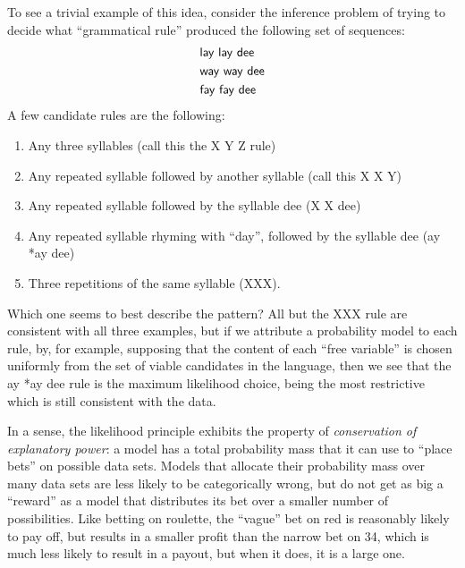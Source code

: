 To see a trivial example of this idea, consider the inference problem of
trying to decide what ``grammatical rule'' produced the following set of sequences:
\begin{align*}
  &{\sf lay\ lay\ dee} \\
  &{\sf way\ way\ dee} \\
  &{\sf fay\ fay\ dee}
\end{align*}
A few candidate rules are the following:
\begin{enumerate}
\item Any three syllables (call this the {\sf X Y Z} rule)
\item Any repeated syllable followed by another syllable (call this
  {\sf X X Y})
\item Any repeated syllable followed by the syllable {\sf dee} ({\sf X
    X dee})
\item Any repeated syllable rhyming with ``day'', followed by the
  syllable {\sf dee} ({\sf *ay *ay dee})
\item Three repetitions of the same syllable ({\sf XXX}).
\end{enumerate}

Which one seems to best describe the pattern?  All but the {\sf XXX}
rule are consistent with all three examples, but if we attribute a
probability model to each rule, by, for example, supposing that the
content of each ``free variable'' is chosen uniformly from the set of
viable candidates in the language, then we see that the {\sf *ay *ay
  dee} rule is the maximum likelihood choice, being the most
restrictive which is still consistent with the data.

In a sense, the likelihood principle exhibits the property of
{\em conservation of explanatory power}: a model has a total
probability mass that it can use to ``place bets'' on possible data
sets.  Models that allocate their probability mass over many data sets
are less likely to be categorically wrong, but do not get as big a
``reward'' as a model that distributes its bet over a smaller number
of possibilities.  Like betting on roulette, the ``vague'' bet on red
is reasonably likely to pay off, but results in a smaller profit than
the narrow bet on 34, which is much less likely to result in a payout,
but when it does, it is a large one.

